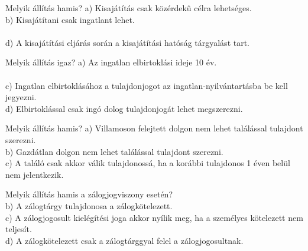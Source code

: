 \begin{frame}

\begin{tcolorbox}[title={121. Kérdés}]
Melyik állítás hamis?
\tcblower
a) Kisajátítás csak közérdekû célra lehetséges.\\
b) Kisajátítani csak ingatlant lehet.\\
\\
d) A kisajátítási eljárás során a kisajátítási hatóság tárgyalást tart.
\end{tcolorbox}
 
\begin{tcolorbox}[title={122. Kérdés}]
Melyik állítás igaz?
\tcblower
a) Az ingatlan elbirtoklási ideje 10 év.\\
\\
c) Ingatlan elbirtoklásához a tulajdonjogot az ingatlan-nyilvántartásba be kell jegyezni.\\
d) Elbirtoklással csak ingó dolog tulajdonjogát lehet megszerezni.
\end{tcolorbox}

\begin{tcolorbox}[title={123. Kérdés}]
Melyik állítás hamis?
\tcblower
a) Villamoson felejtett dolgon nem lehet találással tulajdont szerezni.\\
b) Gazdátlan dolgon nem lehet találással tulajdont szerezni.\\
c) A találó csak akkor válik tulajdonossá, ha a korábbi tulajdonos 1 éven belül nem jelentkezik.\\
\end{tcolorbox}

\begin{tcolorbox}[title={124. Kérdés}]
Melyik állítás hamis a zálogjogviszony esetén?
\tcblower
{}\\
b) A zálogtárgy tulajdonosa a zálogkötelezett.\\
c) A zálogjogosult kielégítési joga akkor nyílik meg, ha a személyes kötelezett nem teljesít. \\
d) A zálogkötelezett csak a zálogtárggyal felel a zálogjogosultnak. 
\end{tcolorbox}

\end{frame}


